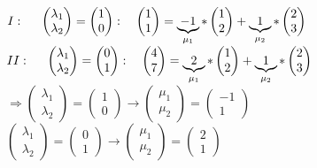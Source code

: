 \documentclass[a4paper,11pt]{article}
\newcommand{\hsp}{\hspace{5mm}}
\begin{document}
\\
$I:\hsp\begin{pmatrix}\lambda_1\\\lambda_2\end{pmatrix}=\begin{pmatrix}1\\0\end{pmatrix}:\quad\begin{pmatrix}1\\1\end{pmatrix}=\underbrace{-1}_{\mu_1}*\begin{pmatrix}1\\2\end{pmatrix}+\underbrace{1}_{\mu_2}*\begin{pmatrix}2\\3\end{pmatrix}$ \\
$II:\hsp\begin{pmatrix}\lambda_1\\\lambda_2\end{pmatrix}=\begin{pmatrix}0\\1\end{pmatrix}:\quad\begin{pmatrix}4\\7\end{pmatrix}=\underbrace{2}_{\mu_1}*\begin{pmatrix}1\\2\end{pmatrix}+\underbrace{1}_{\mu_2}*\begin{pmatrix}2\\3\end{pmatrix}$ \\
$\Rightarrow\begin{pmatrix}\lambda_1\\\lambda_2\end{pmatrix}=\begin{pmatrix}1\\0\end{pmatrix}\rightarrow\begin{pmatrix}\mu_1\\\mu_2\end{pmatrix}=\begin{pmatrix}-1\\1\end{pmatrix}$ \\
$\begin{pmatrix}\lambda_1\\\lambda_2\end{pmatrix}=\begin{pmatrix}0\\1\end{pmatrix}\rightarrow\begin{pmatrix}\mu_1\\\mu_2\end{pmatrix}=\begin{pmatrix}2\\1\end{pmatrix}$ \\
\end{document}
